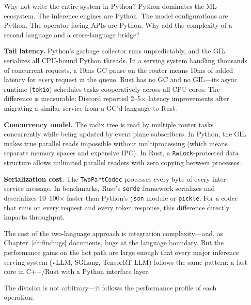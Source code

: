 \begin{whynotbox}{Why not write the entire system in Python?}
Python dominates the ML ecosystem. The inference engines are Python. The model configurations are Python. The operator-facing APIs are Python. Why add the complexity of a second language and a cross-language bridge?

\textbf{Tail latency.} Python's garbage collector runs unpredictably, and the GIL serializes all CPU-bound Python threads. In a serving system handling thousands of concurrent requests, a 10ms GC pause on the router means 10ms of added latency for \emph{every} request in the queue. Rust has no GC and no GIL---its async runtime (\texttt{tokio}) schedules tasks cooperatively across all CPU cores. The difference is measurable: Discord reported 2--5$\times$ latency improvements after migrating a similar service from a GC'd language to Rust.

\textbf{Concurrency model.} The radix tree is read by multiple router tasks concurrently while being updated by event plane subscribers. In Python, the GIL makes true parallel reads impossible without multiprocessing (which means separate memory spaces and expensive IPC). In Rust, a \texttt{RwLock}-protected data structure allows unlimited parallel readers with zero copying between processes.

\textbf{Serialization cost.} The \texttt{TwoPartCodec} processes every byte of every inter-service message. In benchmarks, Rust's \texttt{serde} framework serializes and deserializes 10--100$\times$ faster than Python's \texttt{json} module or \texttt{pickle}. For a codec that runs on every request and every token response, this difference directly impacts throughput.

The cost of the two-language approach is integration complexity---and, as Chapter~\ref{ch:findings} documents, bugs at the language boundary. But the performance gains on the hot path are large enough that every major inference serving system (vLLM, SGLang, TensorRT-LLM) follows the same pattern: a fast core in C++/Rust with a Python interface layer.
\end{whynotbox}

The division is not arbitrary---it follows the performance profile of each operation:

